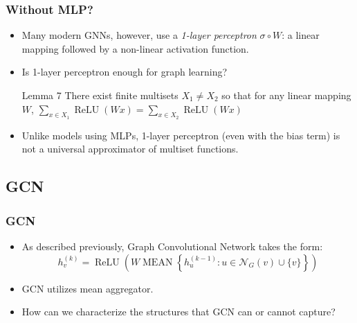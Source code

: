 \documentclass[handout]{beamer}
\DeclareMathOperator{\MEAN}{MEAN}
\DeclareMathOperator{\relu}{ReLU}
\begin{document}
\begin{frame}
\frametitle{Without MLP?}

\begin{itemize}
	\item Many modern GNNs, however, use a {\it 1-layer perceptron} $\sigma \circ W$: a linear mapping followed by a non-linear activation function. \pause
	
	\item Is 1-layer perceptron enough for graph learning? \pause

\begin{block}{Lemma 7}
There exist finite multisets $X_1 \not= X_2$ so that for any linear mapping $W$, $\sum_{x \in X_1} \relu(Wx) = \sum_{x \in X_2} \relu(Wx)$
\end{block} \pause

	\item Unlike models using MLPs, 1-layer perceptron (even with the bias term) is \alert{not a universal approximator of multiset functions}.
	
\end{itemize}

\end{frame}


\subsection{GCN}

\begin{frame}
\frametitle{GCN}

\begin{itemize}
	\item As described previously, Graph Convolutional Network takes the form:
	$$h_v^{(k)} = \relu \left( W \MEAN \left\{ h_u^{(k - 1)} : u \in \mathcal{N}_G(v) \cup \{v\} \right\} \right)$$ \pause
	
	\item GCN utilizes mean aggregator. \pause
	
	\item How can we characterize the structures that GCN can or cannot capture?
\end{itemize}

\end{frame}
\end{document}
